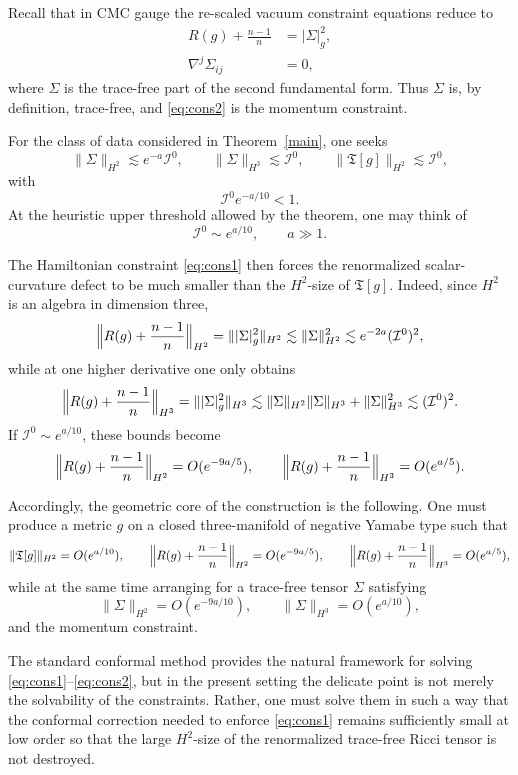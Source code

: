 \documentclass{amsart}
\begin{document}
Recall that in CMC gauge the re-scaled vacuum constraint equations reduce to
\begin{align}
\label{eq:cons1}
R(g)+\frac{n-1}{n} &= |\Sigma|_{g}^{2},\\
\label{eq:cons2}
\nabla^{j}\Sigma_{ij} &= 0,
\end{align}
where \(\Sigma\) is the trace-free part of the second fundamental form. Thus \(\Sigma\) is, by definition, trace-free, and \eqref{eq:cons2} is the momentum constraint.


\noindent For the class of data considered in Theorem~\ref{main}, one seeks
\[
\|\Sigma\|_{H^{2}}\lesssim e^{-a}\mathcal I^{0},
\qquad
\|\Sigma\|_{H^{3}}\lesssim \mathcal I^{0},
\qquad
\|\mathfrak T[g]\|_{H^{2}}\lesssim \mathcal I^{0},
\]
with
\[
\mathcal I^{0}e^{-a/10}< 1.
\]
At the heuristic upper threshold allowed by the theorem, one may think of
\[
\mathcal I^{0}\sim e^{a/10},
\qquad a\gg 1.
\]

\noindent The Hamiltonian constraint \eqref{eq:cons1} then forces the renormalized scalar-curvature defect to be much smaller than the \(H^{2}\)-size of \(\mathfrak T[g]\). Indeed, since \(H^{2}\) is an algebra in dimension three,
\[
\Bigl\|R(g)+\frac{n-1}{n}\Bigr\|_{H^{2}}
=
\||\Sigma|_{g}^{2}\|_{H^{2}}
\lesssim
\|\Sigma\|_{H^{2}}^{2}
\lesssim
e^{-2a}(\mathcal I^{0})^{2},
\]
while at one higher derivative one only obtains
\[
\Bigl\|R(g)+\frac{n-1}{n}\Bigr\|_{H^{3}}
=
\||\Sigma|_{g}^{2}\|_{H^{3}}
\lesssim
\|\Sigma\|_{H^{2}}\|\Sigma\|_{H^{3}}+\|\Sigma\|_{H^{3}}^{2}
\lesssim
(\mathcal I^{0})^{2}.
\]
If \(\mathcal I^{0}\sim e^{a/10}\), these bounds become
\[
\Bigl\|R(g)+\frac{n-1}{n}\Bigr\|_{H^{2}}
= O(e^{-9a/5}),
\qquad
\Bigl\|R(g)+\frac{n-1}{n}\Bigr\|_{H^{3}}
= O(e^{a/5}).
\]

\noindent Accordingly, the geometric core of the construction is the following. One must produce a metric \(g\) on a closed three-manifold of negative Yamabe type such that
\[
\|\mathfrak T[g]\|_{H^{2}} = O(e^{a/10}),
\qquad
\Bigl\|R(g)+\frac{n-1}{n}\Bigr\|_{H^{2}} = O(e^{-9a/5}),
\qquad
\Bigl\|R(g)+\frac{n-1}{n}\Bigr\|_{H^{3}} = O(e^{a/5}),
\]
while at the same time arranging for a trace-free tensor \(\Sigma\) satisfying
\[
\|\Sigma\|_{H^{2}} = O(e^{-9a/10}),
\qquad
\|\Sigma\|_{H^{3}} = O(e^{a/10}),
\]
and the momentum constraint.

\noindent The standard conformal method provides the natural framework for solving
\eqref{eq:cons1}--\eqref{eq:cons2}, but in the present setting the delicate point is not merely the solvability of the constraints. Rather, one must solve them in such a way that the conformal correction needed to enforce \eqref{eq:cons1} remains sufficiently small at low order so that the large \(H^{2}\)-size of the renormalized trace-free Ricci tensor is not destroyed.
\end{document}
